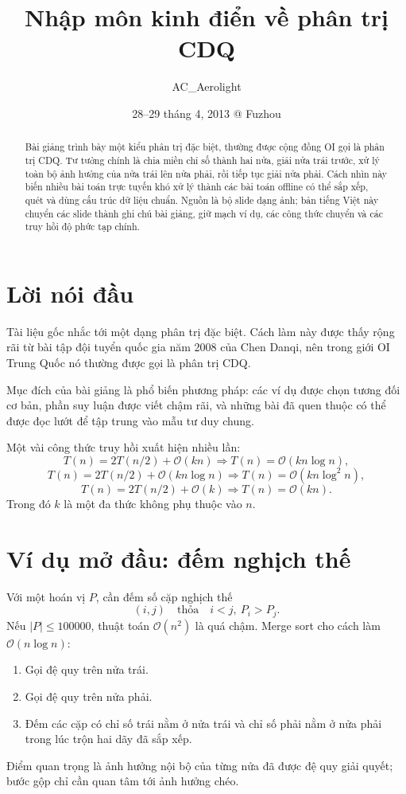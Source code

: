 \documentclass[11pt]{article}
\title{Nhập môn kinh điển về phân trị CDQ}
\author{AC\_Aerolight}
\date{28--29 tháng 4, 2013 @ Fuzhou}
\newcommand{\Oh}{\mathcal{O}}
\begin{document}
\maketitle


\begin{abstract}
Bài giảng trình bày một kiểu phân trị đặc biệt, thường được cộng đồng OI gọi
là phân trị CDQ. Tư tưởng chính là chia miền chỉ số thành hai nửa, giải nửa
trái trước, xử lý toàn bộ ảnh hưởng của nửa trái lên nửa phải, rồi tiếp tục
giải nửa phải. Cách nhìn này biến nhiều bài toán trực tuyến khó xử lý thành
các bài toán offline có thể sắp xếp, quét và dùng cấu trúc dữ liệu chuẩn.
Nguồn là bộ slide dạng ảnh; bản tiếng Việt này chuyển các slide thành ghi chú
bài giảng, giữ mạch ví dụ, các công thức chuyển và các truy hồi độ phức tạp
chính.
\end{abstract}

\tableofcontents

\section{Lời nói đầu}

Tài liệu gốc nhắc tới một dạng phân trị đặc biệt. Cách làm này được thấy
rộng rãi từ bài tập đội tuyển quốc gia năm 2008 của Chen Danqi, nên trong
giới OI Trung Quốc nó thường được gọi là phân trị CDQ.

Mục đích của bài giảng là phổ biến phương pháp: các ví dụ được chọn tương
đối cơ bản, phần suy luận được viết chậm rãi, và những bài đã quen thuộc có
thể được đọc lướt để tập trung vào mẫu tư duy chung.

Một vài công thức truy hồi xuất hiện nhiều lần:
\[
  T(n)=2T(n/2)+\Oh(kn)\Rightarrow T(n)=\Oh(kn\log n),
\]
\[
  T(n)=2T(n/2)+\Oh(kn\log n)\Rightarrow
  T(n)=\Oh(kn\log^2 n),
\]
\[
  T(n)=2T(n/2)+\Oh(k)\Rightarrow T(n)=\Oh(kn).
\]
Trong đó \(k\) là một đa thức không phụ thuộc vào \(n\).

\section{Ví dụ mở đầu: đếm nghịch thế}

Với một hoán vị \(P\), cần đếm số cặp nghịch thế
\[
  (i,j)\quad\text{thỏa}\quad i<j,\ P_i>P_j.
\]
Nếu \(|P|\le 100000\), thuật toán \(\Oh(n^2)\) là quá chậm. Merge sort cho
cách làm \(\Oh(n\log n)\):
\begin{enumerate}
  \item Gọi đệ quy trên nửa trái.
  \item Gọi đệ quy trên nửa phải.
  \item Đếm các cặp có chỉ số trái nằm ở nửa trái và chỉ số phải nằm ở nửa
  phải trong lúc trộn hai dãy đã sắp xếp.
\end{enumerate}
Điểm quan trọng là ảnh hưởng nội bộ của từng nửa đã được đệ quy giải quyết;
bước gộp chỉ cần quan tâm tới ảnh hưởng chéo.
\end{document}
